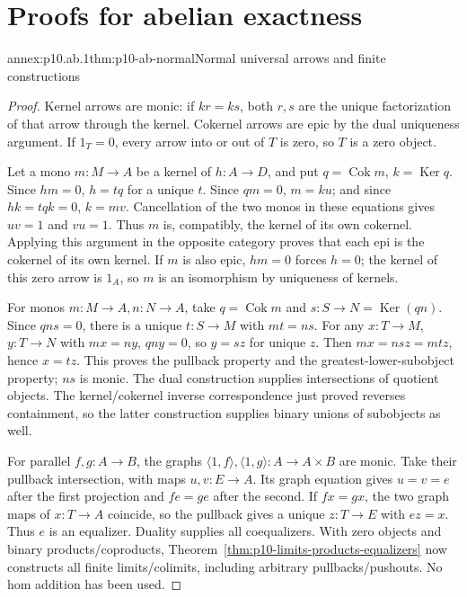 \section{Proofs for abelian exactness}
\label{annex:p10-abelian-exact}

\begin{annexitem}{annex:p10.ab.1}{thm:p10-ab-normal}{Normal universal arrows and finite constructions}
\begin{proof}
Kernel arrows are monic: if \(kr=ks\), both \(r,s\) are the unique
factorization of that arrow through the kernel. Cokernel arrows are epic
by the dual uniqueness argument. If \(1_T=0\), every arrow into or out
of \(T\) is zero, so \(T\) is a zero object.

Let a mono \(m:M\to A\) be a kernel of \(h:A\to D\), and put
\(q=\operatorname{Cok}m\), \(k=\operatorname{Ker}q\).
Since \(hm=0\), \(h=tq\) for a unique \(t\). Since \(qm=0\),
\(m=ku\); and since \(hk=tqk=0\), \(k=mv\).
Cancellation of the two monos in these equations gives \(uv=1\) and
\(vu=1\). Thus \(m\) is, compatibly, the kernel of its own cokernel.
Applying this argument in the opposite category proves that each epi is
the cokernel of its own kernel. If \(m\) is also epic, \(hm=0\)
forces \(h=0\); the kernel of this zero arrow is \(1_A\), so \(m\)
is an isomorphism by uniqueness of kernels.

For monos \(m:M\to A,n:N\to A\), take \(q=\operatorname{Cok}m\)
and \(s:S\to N=\operatorname{Ker}(qn)\). Since \(qns=0\), there
is a unique \(t:S\to M\) with \(mt=ns\). For any \(x:T\to M\),
\(y:T\to N\) with \(mx=ny\), \(qny=0\), so \(y=sz\) for
unique \(z\). Then \(mx=nsz=mtz\), hence \(x=tz\). This proves
the pullback property and the greatest-lower-subobject property; \(ns\)
is monic. The dual construction supplies intersections of quotient
objects. The kernel/cokernel inverse correspondence just proved reverses
containment, so the latter construction supplies binary unions of
subobjects as well.

For parallel \(f,g:A\to B\), the graphs
\(\langle1,f\rangle,\langle1,g\rangle:A\to A\times B\) are
monic. Take their pullback intersection, with maps \(u,v:E\to A\).
Its graph equation gives \(u=v=e\) after the first projection and
\(fe=ge\) after the second. If \(fx=gx\), the two graph maps of
\(x:T\to A\) coincide, so the pullback gives a unique \(z:T\to E\)
with \(ez=x\). Thus \(e\) is an equalizer. Duality supplies all
coequalizers. With zero objects and binary products/coproducts,
Theorem~\ref{thm:p10-limits-products-equalizers} now constructs all
finite limits/colimits, including arbitrary pullbacks/pushouts. No hom
addition has been used.
\end{proof}
\end{annexitem}

